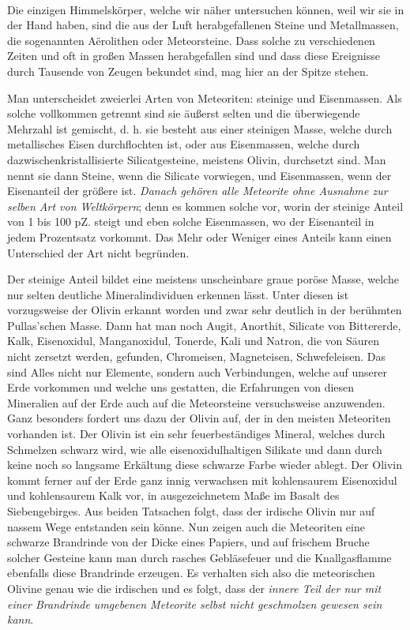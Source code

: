 \documentclass[a4paper, 11pt, oneside, german]{article}
\begin{document}
\paragraph{}
Die einzigen Himmelskörper, welche wir näher untersuchen können, weil wir sie in der Hand haben, sind die aus der Luft herabgefallenen Steine und Metallmassen, die sogenannten Aërolithen oder Meteorsteine. Dass solche zu verschiedenen Zeiten und oft in großen Massen herabgefallen sind und dass diese Ereignisse durch Tausende von Zeugen bekundet sind, mag hier an der Spitze stehen.

Man unterscheidet zweierlei Arten von Meteoriten: steinige und Eisenmassen. Als solche vollkommen getrennt sind sie äußerst selten und die überwiegende Mehrzahl ist gemischt, d. h. sie besteht aus einer steinigen Masse, welche durch metallisches Eisen durchflochten ist, oder aus Eisenmassen, welche durch dazwischenkristallisierte Silicatgesteine, meistens Olivin, durchsetzt sind. Man nennt sie dann Steine, wenn die Silicate vorwiegen, und Eisenmassen, wenn der Eisenanteil der größere ist. \emph{Danach gehören alle Meteorite ohne Ausnahme zur selben Art von Weltkörpern}; denn es kommen solche vor, worin der steinige Anteil von 1 bis 100 pZ. steigt und eben solche Eisenmassen, wo der Eisenanteil in jedem Prozentsatz vorkommt. Das Mehr oder Weniger eines Anteils kann einen Unterschied der Art nicht begründen.

Der steinige Anteil bildet eine meistens unscheinbare graue poröse Masse, welche nur selten deutliche Mineralindividuen erkennen lässt. Unter diesen ist vorzugsweise der Olivin erkannt worden und zwar sehr deutlich in der berühmten Pullas'schen Masse. Dann hat man noch Augit, Anorthit, Silicate von Bittererde, Kalk, Eisenoxidul, Manganoxidul, Tonerde, Kali und Natron, die von Säuren nicht zersetzt werden, gefunden, Chromeisen, Magneteisen, Schwefeleisen. Das sind Alles nicht nur Elemente, sondern auch Verbindungen, welche auf unserer Erde vorkommen und welche uns gestatten, die Erfahrungen von diesen Mineralien auf der Erde auch auf die Meteorsteine versuchsweise anzuwenden. Ganz besonders fordert uns dazu der Olivin auf, der in den meisten Meteoriten vorhanden ist. Der Olivin ist ein sehr feuerbeständiges Mineral, welches durch Schmelzen schwarz wird, wie alle eisenoxidulhaltigen Silikate und dann durch keine noch so langsame Erkältung diese schwarze Farbe wieder ablegt. Der Olivin kommt ferner auf der Erde ganz innig verwachsen mit kohlensaurem Eisenoxidul und kohlensaurem Kalk vor, in ausgezeichnetem Maße im Basalt des Siebengebirges. Aus beiden Tatsachen folgt, dass der irdische Olivin nur auf nassem Wege entstanden sein könne. Nun zeigen auch die Meteoriten eine schwarze Brandrinde von der Dicke eines Papiers, und auf frischem Bruche solcher Gesteine kann man durch rasches Gebläsefeuer und die Knallgasflamme ebenfalls diese Brandrinde erzeugen. Es verhalten sich also die meteorischen Olivine genau wie die irdischen und es folgt, dass der \emph{innere Teil der nur mit einer Brandrinde umgebenen Meteorite selbst nicht geschmolzen gewesen sein kann}.
\end{document}
